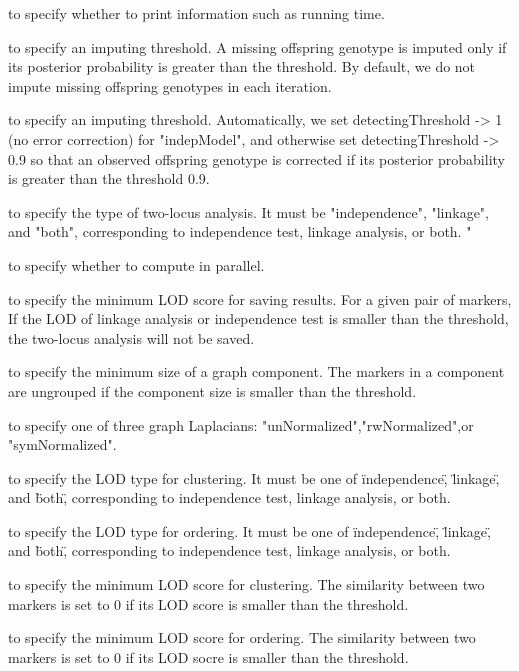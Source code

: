 \documentclass[12pt]{article}
\begin{document}
\begin{description}[noitemsep]
\item[isPrintTimeElapsed -> True] to specify whether to print information such as running time. 
\item[imputingThreshold -> 1] to specify an imputing threshold. A missing offspring genotype is imputed only if its posterior probability is greater than the threshold. By default, we do not impute missing offspring genotypes in each iteration. 
\item[detectingThreshold -> Automatic] to specify an imputing threshold. Automatically, we set detectingThreshold -> 1 (no error correction) for "indepModel", and otherwise set detectingThreshold -> 0.9 so that an observed offspring genotype is corrected if its posterior probability is greater than the threshold 0.9.
\item[computingLodType -> "both"] to specify the type of two-locus analysis. It must be "independence", "linkage", and "both", corresponding to independence test, linkage analysis, or both. "
\item[isRunInParallel -> True] to specify whether to compute in parallel.
\item[minLodSaving -> 1] to specify the minimum LOD score for saving results. For a given pair of markers, If the LOD of linkage analysis or independence test is smaller than the threshold, the two-locus analysis will not be saved. 
\item[miniComponentSize -> 5] to specify the minimum size of a graph component. The markers in a component are ungrouped if the component size is smaller than the threshold.
\item[graphLaplacian -> "rwNormalized"] to specify one of three graph Laplacians: "unNormalized","rwNormalized",or "symNormalized".
\item[lodTypeClustering -> "both"] to specify the LOD type for clustering. It must be one of \"independence\", \"linkage\", and \"both\", corresponding to independence test, linkage analysis, or both. 
\item[lodTypeOrdering -> "both"] to specify the LOD type for ordering. It must be one of \"independence\", \"linkage\", and \"both\", corresponding to independence test, linkage analysis, or both.
\item[minLodClustering -> Automatic] to specify the minimum LOD score for clustering. The similarity between two markers is set to 0 if its LOD score is smaller than the threshold. 
\item[minLodOrdering -> Automatic] to specify the minimum LOD score for ordering. The similarity between two markers is set to 0 if its LOD socre is smaller than the threshold.

\end{description}
\end{document}
